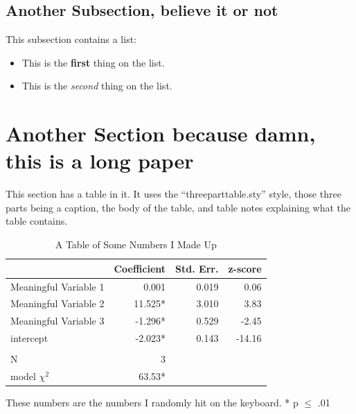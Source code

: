 \documentclass[12pt]{article}
\begin{document}
\subsection*{Another Subsection, believe it or not}

This subsection contains a list:

\begin{itemize}
\item This is the {\bf first} thing on the list.
\item This is the {\it second} thing on the list.
\end{itemize}


\section*{Another Section because damn, this is a long paper}

This section has a table in it. It uses the ``{\sf threeparttable.sty}'' style, those three parts being a caption, the body of the table, and table notes explaining what the table contains. 

\begin{table}[ht]
\begin{center}
\begin{threeparttable}
\caption{A Table of Some Numbers I Made Up\tnote{\dag}} \label{tab:somenumbers}
\begin{tabular}{lrrr}
\hline \hline
 &Coefficient  &Std. Err. & z-score\\ \hline


Meaningful Variable 1	&	0.001	&	0.019	&	0.06	\\
Meaningful Variable 2	&	11.525*	&	3.010	&	3.83	\\
Meaningful Variable 3 &	-1.296*	&	0.529	&	-2.45	\\
intercept	&	-2.023*	&	0.143	&	-14.16	\\ \\

N & 3  \\
model $\chi^2$	& 63.53*				\\ \hline

\hline \hline

\end{tabular}
\begin{tablenotes}
\item[\dag] {{\footnotesize These numbers are the numbers I randomly hit on the keyboard. * p $\leq$ .01}}
\end{tablenotes}
\end{threeparttable}
\end{center}
\end{table}
\end{document}
